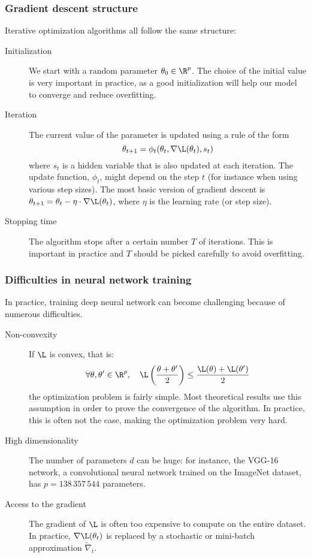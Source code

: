 \subsubsection{Gradient descent structure}
Iterative optimization algorithms all follow the same structure:
\begin{description}
    \item[Initialization] We start with a random parameter $\theta_0\in\R^p$. The choice of the initial value is very important in practice, as a good initialization will help our model to converge and reduce overfitting.
    \item[Iteration] The current value of the parameter is updated using a rule of the form
    \begin{equation*}
        \theta_{t+1}=\phi_t(\theta_t,\nabla\L(\theta_t),s_t)
    \end{equation*}
    where $s_t$ is a hidden variable that is also updated at each iteration. The update function, $\phi_t$, might depend on the step $t$ (for instance when using various step sizes). The most basic version of gradient descent is $\theta_{t+1}=\theta_t-\eta\cdot\nabla\L(\theta_t)$, where $\eta$ is the learning rate (or step size).
    \item[Stopping time] The algorithm stops after a certain number $T$ of iterations. This is important in practice and $T$ should be picked carefully to avoid overfitting.
\end{description}

\subsubsection{Difficulties in neural network training}
In practice, training deep neural network can become challenging because of numerous difficulties.
\begin{description}
    \item[Non-convexity] If $\L$ is convex, that is:
    \begin{equation*}
        \forall\theta,\theta'\in\R^p, \quad \L\left(\frac{\theta+\theta'}{2}\right) \leq \frac{\L(\theta)+\L(\theta')}{2}
    \end{equation*}
    the optimization problem is fairly simple. Most theoretical results use this assumption in order to prove the convergence of the algorithm. In practice, this is often not the case, making the optimization problem very hard.
    \item[High dimensionality] The number of parameters $d$ can be huge: for instance, the VGG-16 network, a convolutional neural network trained on the ImageNet dataset, has $p=138\,357\,544$ parameters.
    \item[Access to the gradient] The gradient of $\L$ is often too expensive to compute on the entire dataset. In practice, $\nabla\L(\theta_t)$ is replaced by a stochastic or mini-batch approximation $\tilde{\nabla}_t$. 
\end{description}

